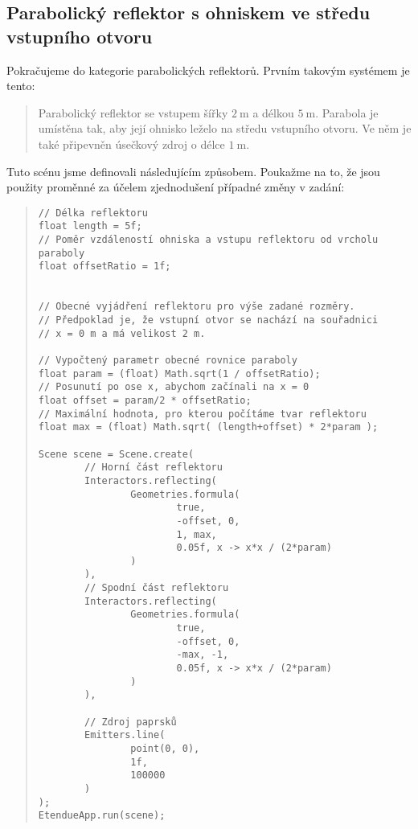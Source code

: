\subsection{Parabolický reflektor s ohniskem ve středu vstupního otvoru}

Pokračujeme do kategorie parabolických reflektorů. Prvním takovým systémem je tento:

\begin{quote}
    Parabolický reflektor se vstupem šířky $2\ \mathrm{m}$ a délkou $5\ \mathrm{m}$. Parabola je umístěna tak, aby její ohnisko leželo na středu vstupního otvoru. Ve něm je také připevněn úsečkový zdroj o délce $1\ \mathrm{m}$.
\end{quote}

Tuto scénu jsme definovali následujícím způsobem. Poukažme na to, že jsou použity proměnné za účelem zjednodušení případné změny v zadání:

\begin{minipage}{\textwidth}\begin{quote}\begin{lstlisting}
// Délka reflektoru
float length = 5f;
// Poměr vzdáleností ohniska a vstupu reflektoru od vrcholu paraboly
float offsetRatio = 1f;


// Obecné vyjádření reflektoru pro výše zadané rozměry.
// Předpoklad je, že vstupní otvor se nachází na souřadnici
// x = 0 m a má velikost 2 m.

// Vypočtený parametr obecné rovnice paraboly
float param = (float) Math.sqrt(1 / offsetRatio);
// Posunutí po ose x, abychom začínali na x = 0
float offset = param/2 * offsetRatio;
// Maximální hodnota, pro kterou počítáme tvar reflektoru
float max = (float) Math.sqrt( (length+offset) * 2*param );

Scene scene = Scene.create(
        // Horní část reflektoru
        Interactors.reflecting(
                Geometries.formula(
                        true,
                        -offset, 0,
                        1, max,
                        0.05f, x -> x*x / (2*param)
                )
        ),
        // Spodní část reflektoru
        Interactors.reflecting(
                Geometries.formula(
                        true,
                        -offset, 0,
                        -max, -1,
                        0.05f, x -> x*x / (2*param)
                )
        ),

        // Zdroj paprsků
        Emitters.line(
                point(0, 0),
                1f,
                100000
        )
);
EtendueApp.run(scene);
\end{lstlisting}\end{quote}\end{minipage}

